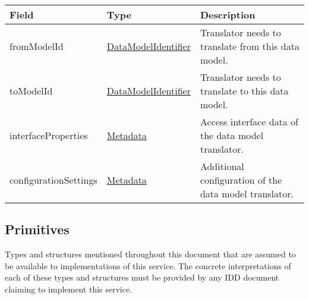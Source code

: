 \documentclass[a4paper]{arrowhead}
\newcommand{\pref}[1]{{\textcolor{ArrowheadGrey}{\hyperref[sec:model:primitives:#1]{#1}}}}
\begin{document}
\begin{table}[ht!]
\begin{tabularx}{\textwidth}{| p{4.5cm} | p{3.5cm} | X |} \hline
\rowcolor{gray!33} Field & Type      & Description \\ \hline
fromModelId & \pref{DataModelIdentifier} & Translator needs to translate from this data model.  \\ \hline
toModelId & \pref{DataModelIdentifier} & Translator needs to translate to this data model. \\ \hline
interfaceProperties &\hyperref[sec:model:Metadata]{Metadata} & Access interface data of the data model translator. \\ \hline
configurationSettings &\hyperref[sec:model:Metadata]{Metadata} & Additional configuration of the data model translator. \\ \hline
\end{tabularx}
\end{table}

\subsection{Primitives}
\label{sec:model:primitives}

Types and structures mentioned throughout this document that are assumed to be available to implementations of this service.
The concrete interpretations of each of these types and structures must be provided by any IDD document claiming to implement this service.
\end{document}
